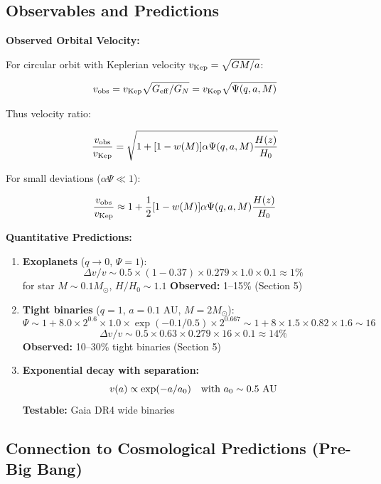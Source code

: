 \documentclass[11pt,a4paper]{article}
\begin{document}
\hypertarget{observables-and-predictions}{%
\subsection{Observables and
Predictions}\label{observables-and-predictions}}

\textbf{Observed Orbital Velocity:}

For circular orbit with Keplerian velocity
\(v_{\rm Kep} = \sqrt{GM/a}\):

\[v_{\rm obs} = v_{\rm Kep} \sqrt{G_{\rm eff}/G_N} = v_{\rm Kep} \sqrt{\Psi(q,a,M)}\]

Thus velocity ratio:

\[\frac{v_{\rm obs}}{v_{\rm Kep}} = \sqrt{1 + [1-w(M)] \alpha \Psi(q,a,M) \frac{H(z)}{H_0}}\]

For small deviations (\(\alpha \Psi \ll 1\)):

\[\frac{v_{\rm obs}}{v_{\rm Kep}} \approx 1 + \frac{1}{2}[1-w(M)] \alpha \Psi(q,a,M) \frac{H(z)}{H_0}\]

\textbf{Quantitative Predictions:}

\begin{enumerate}
\def\labelenumi{\arabic{enumi}.}
\item
  \textbf{Exoplanets} (\(q \to 0\), \(\Psi = 1\)):
  \[\Delta v/v \sim 0.5 \times (1-0.37) \times 0.279 \times 1.0 \times 0.1 \approx 1\%\]
  for star \(M \sim 0.1 M_\odot\), \(H/H_0 \sim 1.1\) \textbf{Observed:}
  1--15\% \checkmark{} (Section 5)
\item
  \textbf{Tight binaries} (\(q=1\), \(a=0.1\) AU, \(M=2 M_\odot\)):
  \[\Psi \sim 1 + 8.0 \times 2^{0.6} \times 1.0 \times \exp(-0.1/0.5) \times 2^{0.667} \sim 1 + 8 \times 1.5 \times 0.82 \times 1.6 \sim 16\]
  \[\Delta v/v \sim 0.5 \times 0.63 \times 0.279 \times 16 \times 0.1 \approx 14\%\]
  \textbf{Observed:} 10--30\% tight binaries \checkmark{} (Section 5)
\item
  \textbf{Exponential decay with separation:}
  \[v(a) \propto \exp(-a/a_0) \quad \text{with } a_0 \sim 0.5~{\rm AU}\]
  \textbf{Testable:} Gaia DR4 wide binaries \checkmark{}
\end{enumerate}

\hypertarget{connection-to-cosmological-predictions-pre-big-bang}{%
\subsection{Connection to Cosmological Predictions (Pre-Big
Bang)}\label{connection-to-cosmological-predictions-pre-big-bang}}
\end{document}
